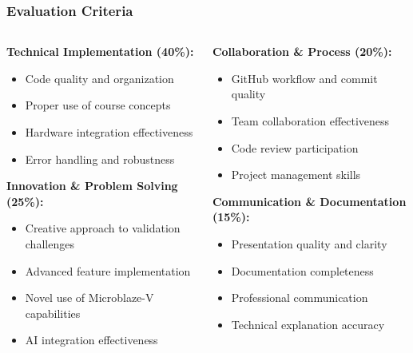 \documentclass{beamer}
\begin{document}
\begin{frame}
\frametitle{Evaluation Criteria}
\begin{columns}[T]
\begin{column}{0.5\textwidth}
\tiny \textbf{Technical Implementation (40\%):}

\begin{itemize}\tiny
    \item \tiny Code quality and organization
    \item \tiny Proper use of course concepts
    \item \tiny Hardware integration effectiveness
    \item \tiny Error handling and robustness
\end{itemize}

\tiny \textbf{Innovation \& Problem Solving (25\%):}
\begin{itemize}\tiny
    \item \tiny Creative approach to validation challenges
    \item \tiny Advanced feature implementation
    \item \tiny Novel use of Microblaze-V capabilities
    \item \tiny AI integration effectiveness
\end{itemize}
\end{column}

\begin{column}{0.5\textwidth}
\tiny \textbf{Collaboration \& Process (20\%):}
\begin{itemize}\tiny
    \item \tiny GitHub workflow and commit quality
    \item \tiny Team collaboration effectiveness
    \item \tiny Code review participation
    \item \tiny Project management skills
\end{itemize}

\tiny \textbf{Communication \& Documentation (15\%):}
\begin{itemize}\tiny
    \item \tiny Presentation quality and clarity
    \item \tiny Documentation completeness
    \item \tiny Professional communication
    \item \tiny Technical explanation accuracy
\end{itemize}
\end{column}
\end{columns}
\end{frame}
\end{document}
